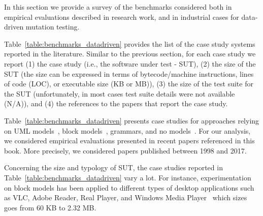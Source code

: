 


\clearpage

\label{section:industry:data}

In this section we provide a survey of the benchmarks considered both in empirical evaluations described in research work, and in industrial cases for data-driven mutation testing.


Table~\ref{table:benchmarks_datadriven} provides the list of the case study systems reported in the literature. Similar to the previous section, for each case study we report (1) the case study (i.e., the software under test - SUT), (2) the size of the SUT (the size can be expressed in terms of bytecode/machine instructions, lines of code (LOC), or executable size (KB or MB)), (3) the size of the test suite for the SUT (unfortunately, in most cases test suite details were not available (N/A)), and (4) the references to the papers that report the case study.

Table~\ref{table:benchmarks_datadriven} presents case studies for approaches relying on UML models~\cite{di2017augmenting}, block models~\cite{pham2016model}, grammars, and no models~\cite{AFL:industrialcases}.
For our analysis, we considered empirical evaluations presented in recent papers referenced in this book. More precisely, we considered papers published between 1998 and 2017.

Concerning the size and typology of SUT, the case studies reported in Table~\ref{table:benchmarks_datadriven} vary a lot.
For instance, experimentation on block models has been applied to different types of desktop applications such as VLC, Adobe Reader, Real Player, and Windows Media Player~\cite{pham2016model} which sizes goes from 60 KB to 2.32 MB. 

